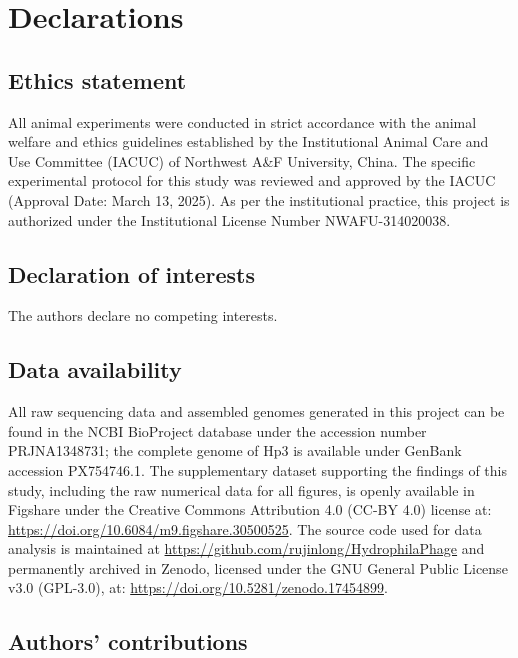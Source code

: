 \section{Declarations}\label{declarations}

\subsection{Ethics statement}\label{ethics-statement}

All animal experiments were conducted in strict accordance with the
animal welfare and ethics guidelines established by the Institutional
Animal Care and Use Committee (IACUC) of Northwest A\&F University,
China. The specific experimental protocol for this study was reviewed
and approved by the IACUC (Approval Date: March 13, 2025). As per the
institutional practice, this project is authorized under the
Institutional License Number NWAFU-314020038.

\subsection{Declaration of interests}\label{competing-interests}

The authors declare no competing interests.

\subsection{Data availability}\label{data-availability}

All raw sequencing data and assembled genomes generated in this project
can be found in the NCBI BioProject database under the accession number
PRJNA1348731; the complete genome of Hp3 is available under GenBank
accession PX754746.1. The supplementary dataset supporting the findings of this
study, including the raw numerical data for all figures, is openly
available in Figshare under the Creative Commons Attribution 4.0 (CC-BY
4.0) license at: \url{https://doi.org/10.6084/m9.figshare.30500525}. The
source code used for data analysis is maintained at
\url{https://github.com/rujinlong/HydrophilaPhage} and permanently
archived in Zenodo, licensed under the GNU General Public License v3.0
(GPL-3.0), at: \url{https://doi.org/10.5281/zenodo.17454899}.

\subsection{Authors' contributions}\label{authors-contributions}

